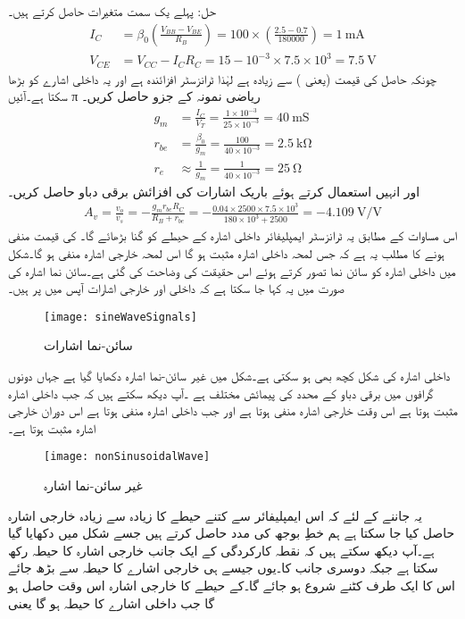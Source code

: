 حل:	پہلے یک سمت متغیرات حاصل کرتے ہیں۔
\begin{align*}
I_C&=\beta_0 \left(\frac{V_{BB}-V_{BE}}{R_B} \right )=100 \times \left(\frac{2.5-0.7}{180000} \right )=\SI{1}{\milli \ampere}\\
V_{CE}&=V_{CC}-I_C R_C=15-10^{-3} \times 7.5 \times 10^{3}=\SI{7.5}{\volt}
\end{align*}
چونکہ حاصل  کی قیمت   (یعنی ) سے زیادہ ہے لہٰذا ٹرانزسٹر افزائندہ ہے اور یہ داخلی اشارے کو بڑھا سکتا ہے۔آئیں π ریاضی نمونہ  کے جزو حاصل کریں۔
\begin{align*}
g_m &=\frac{I_C}{V_T}=\frac{1 \times 10^{-3}}{25 \times 10^{-3}}=\SI{40}{\milli \siemens}\\
r_{be}&=\frac{\beta_0}{g_m}=\frac{100}{40 \times 10^{-3}}=\SI{2.5}{\kilo \ohm}\\
r_e& \approx \frac{1}{g_m}=\frac{1}{40 \times 10^{-3}}=\SI{25}{\ohm}
\end{align*}
اور انہیں استعمال کرتے ہوئے باریک اشارات کی افزائش برقی دباو  حاصل کریں۔
\begin{align*}
A_v =\frac{v_o}{v_s}=-\frac{g_m r_{be} R_C}{ R_B+r_{be}}=-\frac{0.04 \times 2500 \times 7.5 \times 10^3}{180 \times 10^{3}+2500}=\SI[per=frac,fraction=nice]{-4.109}{\volt \per \volt}
\end{align*}
اس مساوات کے مطابق یہ ٹرانزسٹر ایمپلیفائر داخلی اشارہ  کے حیطے کو  گنا بڑھائے گا۔ کی قیمت منفی ہونے کا مطلب یہ ہے کہ جس لمحہ داخلی اشارہ مثبت ہو گا اس لمحہ خارجی اشارہ منفی ہو گا۔شکل میں داخلی اشارہ کو سائن نما تصور کرتے ہوئے اس حقیقت کی وضاحت کی گئی ہے۔سائن نما اشارہ کی صورت میں یہ کہا جا سکتا ہے کہ داخلی اور خارجی اشارات آپس میں  پر ہیں۔ 
\begin{figure}
\centering
\texttt{[image: sineWaveSignals]}
\caption{سائن-نما اشارات}
\label{شکل_سائن_نما_اشارات}
\end{figure}
داخلی اشارہ کی شکل کچھ بھی ہو سکتی ہے۔شکل   میں غیر سائن-نما اشارہ دکھایا گیا ہے جہاں دونوں گرافوں میں برقی دباو کے محدد کی پیمائش مختلف ہے ۔آپ دیکھ سکتے ہیں کہ جب داخلی اشارہ مثبت ہوتا ہے اس وقت خارجی اشارہ منفی ہوتا ہے اور جب داخلی اشارہ منفی ہوتا ہے اس دوران خارجی اشارہ مثبت ہوتا ہے۔ 
\begin{figure}
\centering
\texttt{[image: nonSinusoidalWave]}
\caption{غیر سائن-نما اشارہ}
\label{شکل_غیر_سائن_نما_اشارہ}
\end{figure}
یہ جاننے کے لئے کہ اس ایمپلیفائر سے کتنے حیطے کا زیادہ سے زیادہ خارجی اشارہ   حاصل کیا جا سکتا ہے ہم خطِ بوجھ  کی مدد حاصل کرتے ہیں جسے شکل   میں دکھایا گیا ہے۔آپ دیکھ سکتے ہیں کہ نقطہ کارکردگی کے ایک جانب خارجی اشارہ  کا حیطہ رکھ سکتا ہے جبکہ دوسری جانب  کا۔یوں جیسے ہی خارجی اشارے کا حیطہ  سے بڑھ جائے اس کا ایک طرف کٹنے شروع ہو جائے گا۔کے حیطے کا خارجی اشارہ اس وقت حاصل ہو گا جب داخلی اشارے کا حیطہ   ہو گا یعنی
